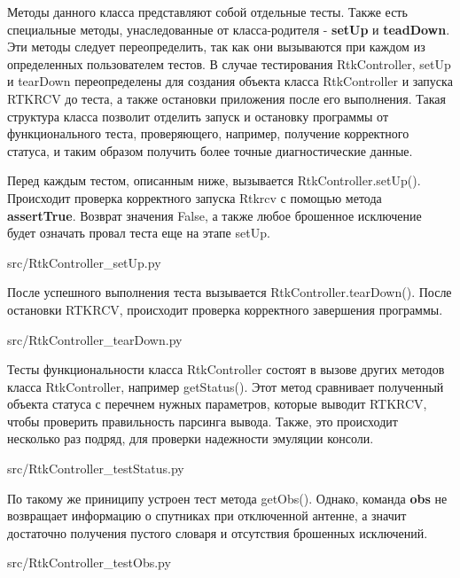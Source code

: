 Методы данного класса представляют собой отдельные тесты. Также есть специальные методы, унаследованные от класса-родителя - \textbf{setUp} и \textbf{teadDown}. Эти методы следует переопределить, так как они вызываются при каждом из определенных пользователем тестов. В случае тестирования RtkController, setUp и tearDown переопределены для создания объекта класса RtkController и запуска RTKRCV до теста, а также остановки приложения после его выполнения. Такая структура класса позволит отделить запуск и остановку программы от функционального теста, проверяющего, например, получение корректного статуса, и таким образом получить более точные диагностические данные.

Перед каждым тестом, описанным ниже, вызывается RtkController.setUp(). Происходит проверка корректного запуска Rtkrcv с помощью метода \textbf{assertTrue}. Возврат значения False, а также любое брошенное исключение будет означать провал теста еще на этапе setUp.


{src/RtkController_setUp.py}

После успешного выполнения теста вызывается RtkController.tearDown(). После остановки RTKRCV, происходит проверка корректного завершения программы.


{src/RtkController_tearDown.py}

Тесты функциональности класса RtkController состоят в вызове других методов класса RtkController, например getStatus(). Этот метод сравнивает полученный объекта статуса с перечнем нужных параметров, которые выводит RTKRCV, чтобы проверить правильность парсинга вывода. Также, это происходит несколько раз подряд, для проверки надежности эмуляции консоли.


{src/RtkController_testStatus.py}

По такому же приниципу устроен тест метода getObs(). Однако, команда \textbf{obs} не возвращает информацию о спутниках при отключенной антенне, а значит достаточно получения пустого словаря и отсутствия брошенных исключений.


{src/RtkController_testObs.py}

